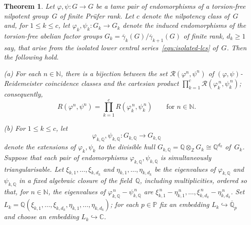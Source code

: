 \documentclass[12pt, a4paper]{amsart}
\newtheorem{theorem}{Theorem}
\begin{document}
\begin{theorem}\label{thm:growth-coinc}
  Let $\varphi, \psi \colon G \to G$ be a tame pair of endomorphisms of a
  torsion-free nilpotent group~$G$ of finite Pr\"ufer rank.  Let $c$
  denote the nilpotency class of~$G$ and, for $1 \le k \le c$, let
  $\varphi_k ,\psi_k \colon G_k \to G_k$ denote the induced
  endomorphisms of the torsion-free abelian factor groups
  $G_k=\overline{\gamma}_k(G) / \overline{\gamma}_{k+1}(G)$ of finite
  rank, $d_k\geq 1$ say, that arise from the isolated lower central
  series~\eqref{equ:isolated-lcs} of~$G$.  Then the following hold.

  \smallskip

  \rm{(a)} For each $n \in \mathbb{N}$, there is a bijection
  between the set $\mathcal{R}(\varphi^n, \psi^n)$ of
  $(\varphi,\psi)$-Reidemeister coincidence classes and the cartesian
  product $\prod_{k=1}^c \mathcal{R}(\varphi_k^{\, n}, \psi_k^{\, n})$;
  consequently,
  \begin{equation}\label{eq:reidemeister-coincidence-romankov}
    R(\varphi^n, \psi^n) = \prod_{k=1}^c R(\varphi_k^{\, n},
    \psi_k^{\, n}) \qquad \text{for $n \in \mathbb{N}$.}
  \end{equation}

  \rm{(b)} For $1 \le k \le c$, let
  \[
    \varphi_{k,\mathbb{Q}}, \psi_{k,\mathbb{Q}} \colon
    G_{k,\mathbb{Q}} \to
    G_{k,\mathbb{Q}}
  \]
  denote the extensions of $\varphi_k, \psi_k$ to the divisible hull
  $G_{k,\mathbb{Q}} = \mathbb{Q} \otimes_\mathbb{Z} G_k \cong
  \mathbb{Q}^{d_k}$ of~$G_k$.  Suppose that each pair of endomorphisms
  $\varphi_{k,\mathbb{Q}}, \psi_{k,\mathbb{Q}}$ is simultaneously
  triangularisable.  Let $\xi_{k,1}, \ldots, \xi_{k,d_k}$ and
  $\eta_{k,1}, \ldots, \eta_{k,d_k}$ be the eigenvalues of
  $\varphi_{k,\mathbb{Q}}$ and $\psi_{k,\mathbb{Q}}$ in a fixed
  algebraic closure of the field~$\mathbb{Q}$, including
  multiplicities, ordered so that, for $n \in \mathbb{N}$, the
  eigenvalues of
  $\varphi_{k,\mathbb{Q}}^{\, n} - \psi_{k,\mathbb{Q}}^{\, n}$ are
  $\xi_{k,1}^{\, n} - \eta_{k,1}^{\, n}, \ldots, \xi_{k,d_k}^{\, n} -
  \eta_{k,d_k}^{\,n}$.  Set
  $L_k = \mathbb{Q}(\xi_{k,1}, \ldots, \xi_{k, d_k}, \eta_{k,1},
  \ldots, \eta_{k, d_k})$; for each $p \in \mathbb{P}$ fix an
  embedding $L_k \hookrightarrow \overline{\mathbb{Q}}_p$ and choose
  an embedding $L_k \hookrightarrow \mathbb{C}$.


\end{theorem}
\end{document}
